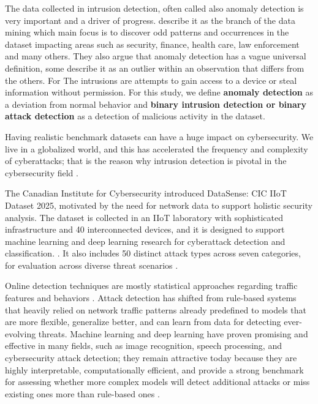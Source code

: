 \documentclass[final,5p,times,twocolumn]{elsarticle}
\begin{document}
The data collected in intrusion detection, often called also anomaly detection is very important and a driver of progress. \cite{akoglu2015graph} describe it as the branch of the data mining which main focus is to discover odd patterns and occurrences in the dataset impacting areas such as security, finance, health care, law enforcement and many others. They also argue that anomaly detection has a vague universal definition, some describe it as an outlier within an observation that differs from the others. For \cite{ahmad2025gat} The intrusions are attempts to gain access to a device or steal information without permission. For this study, we define \textbf{anomaly detection} as a deviation from normal behavior and \textbf{binary intrusion detection or binary attack detection} as a detection of malicious activity in the dataset.

Having realistic benchmark datasets can have a huge impact on cybersecurity. We live in a globalized world, and this has accelerated the frequency and complexity of cyberattacks; that is the reason why intrusion detection is pivotal in the cybersecurity field \citep{zhong2024survey}.

The Canadian Institute for Cybersecurity introduced DataSense: CIC IIoT Dataset 2025, motivated by the need for network data to support holistic security analysis. The dataset is collected in an IIoT laboratory with sophisticated infrastructure and 40 interconnected devices, and it is designed to support machine learning and deep learning research for cyberattack detection and classification.
. It also includes 50 distinct attack types across seven categories, for evaluation across diverse threat scenarios \citep{unb_iiot_2025}.

Online detection techniques are mostly statistical approaches regarding traffic features and behaviors \citep{zhang2010real}. Attack detection has shifted from rule-based systems that heavily relied on network traffic patterns already predefined to models that are more flexible, generalize better, and can learn from data for detecting ever-evolving threats. Machine learning and deep learning have proven promising and effective in many fields, such as image recognition, speech processing, and cybersecurity attack detection; they remain attractive today because they are highly interpretable, computationally efficient, and provide a strong benchmark for assessing whether more complex models will detect additional attacks or miss existing ones more than rule-based ones \citep{alharthi2025comparative}. 
\end{document}
